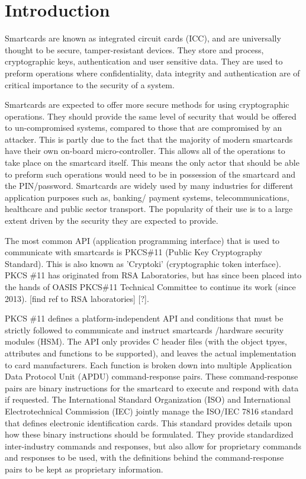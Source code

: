 \documentclass[bsc,frontabs,twoside,singlespacing,parskip,deptreport]{infthesis}     %
\begin{document}


\chapter{Introduction}
Smartcards are known as integrated circuit cards (ICC), and are universally thought to be secure, tamper-resistant devices. They store and process, cryptographic keys, authentication and user sensitive data. They are used to preform operations where confidentiality, data integrity and authentication are of critical importance to the security of a system.

Smartcards are expected to offer more secure methods for using cryptographic operations. They should provide the same level of security that would be offered to un-compromised systems, compared to those that are compromised by an attacker. This is partly due to the fact that the majority of modern smartcards have their own on-board micro-controller. This allows all of the operations to take place on the smartcard itself. This means the only actor that should be able to preform such operations would need to be in possession of the smartcard and the PIN/password. Smartcards are widely used by many industries for different application purposes such as, banking/ payment systems, telecommunications, healthcare and public sector transport. The popularity of their use is to a large extent driven by the security they are expected to provide.

The most common API (application programming interface) that is used to communicate with smartcards is PKCS\#11 (Public Key Cryptography Standard). This is also known as 'Cryptoki' (cryptographic token interface). PKCS \#11 has originated from RSA Laboratories, but has since been placed into the hands of OASIS PKCS\#11 Technical Committee to continue its work (since 2013). [find ref to RSA laboratories] [?]. 

PKCS \#11 defines a platform-independent API and conditions that must be strictly followed to communicate and instruct smartcards /hardware security modules (HSM). The API only provides C header files (with the object tpyes, attributes and functions to be supported), and leaves the actual implementation to card manufacturers. Each function is broken down into multiple Application Data Protocol Unit (APDU) command-response pairs. These command-response pairs are binary instructions for the smartcard to execute and respond with data if requested. The International Standard Organization (ISO) and International Electrotechnical Commission (IEC) jointly manage the ISO/IEC 7816 standard that defines electronic identification cards. This standard provides details upon how these binary instructions should be formulated. They provide standardized inter-industry commands and responses, but also allow for proprietary commands and responses to be used, with the definitions behind the command-response pairs to be kept as proprietary information.
\end{document}
